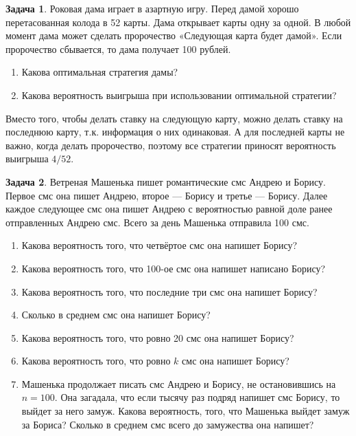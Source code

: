 \documentclass[nobib]{tufte-handout}
\theoremstyle{definition}
\newtheorem{problem}{Задача}
\begin{document}
\begin{problem}
Роковая дама играет в азартную игру. Перед дамой хорошо перетасованная колода в 52 карты. Дама открывает карты одну за одной. В любой момент дама может сделать пророчество «Следующая карта будет дамой». Если пророчество сбывается, то дама получает 100 рублей.

\begin{enumerate}
\item Какова оптимальная стратегия дамы?
\item Какова вероятность выигрыша при использовании оптимальной стратегии?
\end{enumerate}

\begin{sol}
Вместо того, чтобы делать ставку на следующую карту, можно делать ставку на последнюю карту, т.к. информация о них одинаковая. А для последней карты не важно, когда делать пророчество, поэтому все стратегии приносят вероятность выигрыша $4/52$.
\end{sol}

\end{problem}


\begin{problem}
Ветреная Машенька пишет романтические смс Андрею и Борису. Первое смс она пишет Андрею, второе — Борису и третье — Борису. Далее каждое следующее смс она пишет Андрею с вероятностью равной доле ранее отправленных Андрею смс. Всего за день Машенька отправила 100 смс.

\begin{enumerate}
\item Какова вероятность того, что четвёртое смс она напишет Борису?
\item Какова вероятность того, что 100-ое смс она напишет написано Борису?
\item Какова вероятность того, что последние три смс она напишет Борису?
\item Сколько в среднем смс она напишет Борису?
\item Какова вероятность того, что ровно 20 смс она напишет Борису?
\item Какова вероятность того, что ровно $k$ смс она напишет Борису?
\item Машенька продолжает писать смс Андрею и Борису, не остановившись на $n=100$. Она загадала, что если тысячу раз подряд напишет смс Борису, то выйдет за него замуж. Какова вероятность, того, что Машенька выйдет замуж за Бориса? Сколько в среднем смс всего до замужества она напишет?
\end{enumerate}

\begin{sol}


\end{sol}

\end{problem}
\end{document}
